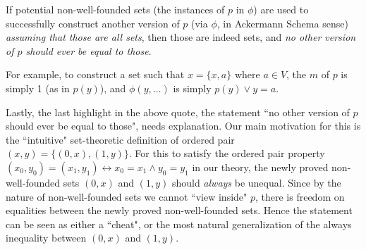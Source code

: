 \documentclass{article}
\begin{document}
\begin{displayquote}
If potential non-well-founded sets (the instances of $p$ in $\phi$) are used to successfully construct another version of $p$ (via $\phi$, in Ackermann Schema sense) \textit{assuming that those are all sets}, then those are indeed sets, and \textit{no other version of $p$ should ever be equal to those}.
\end{displayquote}

For example, to construct a set such that $x=\{x, a\}$ where $a \in V$, the $m$ of $p$ is simply 1 (as in $p(y)$), and $\phi(y, \ldots)$ is simply $p(y) \vee y = a$.

Lastly, the last highlight in the above quote, the statement ``no other version of $p$ should ever be equal to those", needs explanation. Our main motivation for this is the ``intuitive" set-theoretic definition of ordered pair $(x,y) = \{(0,x), (1, y)\}$. For this to satisfy the ordered pair property $(x_0,y_0) = (x_1, y_1) \leftrightarrow x_0 = x_1 \wedge y_0 = y_1$ in our theory, the newly proved non-well-founded sets $(0,x)$ and $(1,y)$ should \textit{always} be unequal. Since by the nature of non-well-founded sets we cannot ``view inside" $p$, there is freedom on equalities between the newly proved non-well-founded sets. Hence the statement can be seen as either a ``cheat", or the most natural generalization of the always inequality between $(0,x)$ and $(1,y)$.



\end{document}
